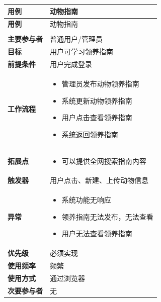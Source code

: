 \documentclass[12pt,a4paper,UTF8]{article}
\begin{document}
\begin{xltabular}{\linewidth}{|>{\raggedright\arraybackslash}p{3cm}|>{\raggedright\arraybackslash}p{8cm}|}
  \hline
  \textbf{用例} & 动物指南 \\ \hline \endfirsthead
  \hline
  \textbf{用例} & 动物指南 \\ \hline \endhead
  \hline
   \\ \endfoot
  \hline \endlastfoot

  \textbf{主要参与者} & 普通用户/管理员 \\ \hline
  \textbf{目标} & 用户可学习领养指南 \\ \hline
  \textbf{前提条件} & 用户完成登录 \\ \hline
  \textbf{工作流程} & 
  \vspace{-0.5em}
  \begin{itemize}[topsep=0pt, partopsep=0pt, left=0pt, nosep]
      \item 管理员发布动物领养指南
      \item 系统更新动物领养指南
      \item 用户点击查看领养指南
      \item 系统返回领养指南
  \end{itemize} \\ \hline
  \textbf{拓展点} &
  \vspace{-0.5em}
  \begin{itemize}[topsep=0pt, partopsep=0pt, left=0pt, nosep]
      \item 可以提供全网搜索指南内容
  \end{itemize} \\ \hline
  \textbf{触发器} & 用户点击、新建、上传动物信息 \\ \hline
  \textbf{异常} & 
  \vspace{-0.5em}
  \begin{itemize}[topsep=0pt, partopsep=0pt, left=0pt, nosep]
      \item 系统功能无响应
      \item 领养指南无法发布，无法查看
      \item 用户无法查看领养指南
  \end{itemize} \\ \hline
  \textbf{优先级} & 必须实现 \\ \hline
  \textbf{使用频率} & 频繁 \\ \hline
  \textbf{使用方式} & 通过浏览器 \\ \hline
  \textbf{次要参与者} & 无 \\ \hline
\end{xltabular}
\end{document}
